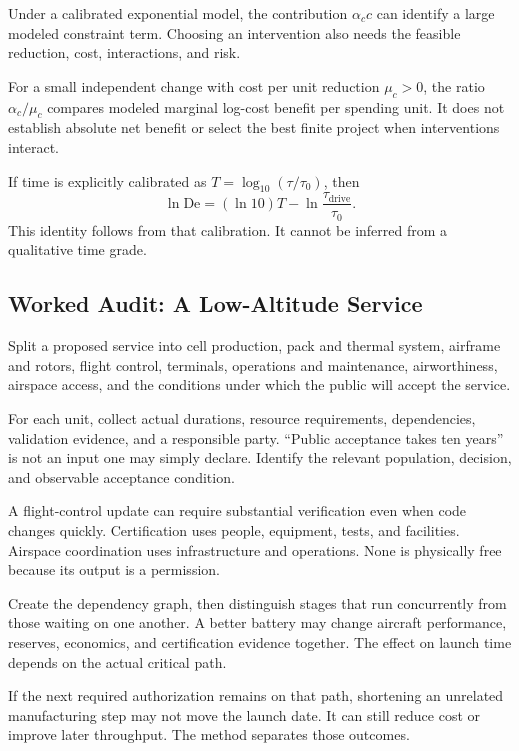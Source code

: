 Under a calibrated exponential model, the contribution $\alpha_c c$ can identify a large modeled constraint term. Choosing an intervention also needs the feasible reduction, cost, interactions, and risk.

For a small independent change with cost per unit reduction $\mu_c>0$, the ratio $\alpha_c/\mu_c$ compares modeled marginal log-cost benefit per spending unit. It does not establish absolute net benefit or select the best finite project when interventions interact.

If time is explicitly calibrated as $T=\log_{10}(\tau/\tau_0)$, then
\begin{equation}
 \ln\mathrm{De}=(\ln10)T
 -\ln\frac{\tau_{\mathrm{drive}}}{\tau_0}.
\end{equation}
This identity follows from that calibration. It cannot be inferred from a qualitative time grade.

\subsection{Worked Audit: A Low-Altitude Service}

Split a proposed service into cell production, pack and thermal system, airframe and rotors, flight control, terminals, operations and maintenance, airworthiness, airspace access, and the conditions under which the public will accept the service.

For each unit, collect actual durations, resource requirements, dependencies, validation evidence, and a responsible party. “Public acceptance takes ten years” is not an input one may simply declare. Identify the relevant population, decision, and observable acceptance condition.

A flight-control update can require substantial verification even when code changes quickly. Certification uses people, equipment, tests, and facilities. Airspace coordination uses infrastructure and operations. None is physically free because its output is a permission.

Create the dependency graph, then distinguish stages that run concurrently from those waiting on one another. A better battery may change aircraft performance, reserves, economics, and certification evidence together. The effect on launch time depends on the actual critical path.

If the next required authorization remains on that path, shortening an unrelated manufacturing step may not move the launch date. It can still reduce cost or improve later throughput. The method separates those outcomes.

